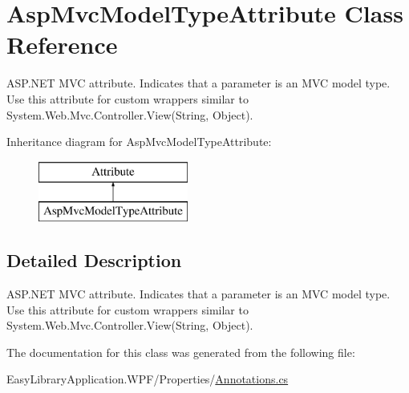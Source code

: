 \hypertarget{class_asp_mvc_model_type_attribute}{}\section{Asp\+Mvc\+Model\+Type\+Attribute Class Reference}
\label{class_asp_mvc_model_type_attribute}


A\+S\+P.\+N\+ET M\+VC attribute. Indicates that a parameter is an M\+VC model type. Use this attribute for custom wrappers similar to {\ttfamily System.\+Web.\+Mvc.\+Controller.\+View(\+String, Object)}.  


Inheritance diagram for Asp\+Mvc\+Model\+Type\+Attribute\+:\begin{figure}[H]
\begin{center}
\leavevmode
\includegraphics[height=2.000000cm]{class_asp_mvc_model_type_attribute}
\end{center}
\end{figure}


\subsection{Detailed Description}
A\+S\+P.\+N\+ET M\+VC attribute. Indicates that a parameter is an M\+VC model type. Use this attribute for custom wrappers similar to {\ttfamily System.\+Web.\+Mvc.\+Controller.\+View(\+String, Object)}. 



The documentation for this class was generated from the following file\+:\begin{DoxyCompactItemize}
\item 
Easy\+Library\+Application.\+W\+P\+F/\+Properties/\mbox{\hyperlink{_annotations_8cs}{Annotations.\+cs}}\end{DoxyCompactItemize}
